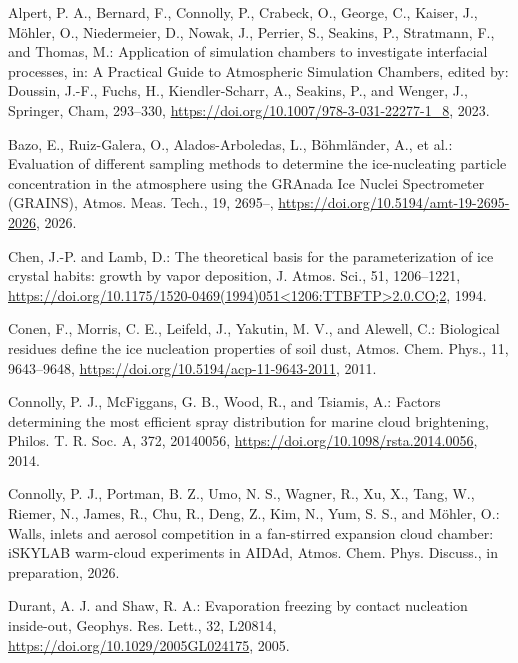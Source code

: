 \begin{thebibliography}{}

Alpert, P. A., Bernard, F., Connolly, P., Crabeck, O., George, C., Kaiser, J., M\"ohler, O., Niedermeier, D., Nowak, J., Perrier, S., Seakins, P., Stratmann, F., and Thomas, M.: Application of simulation chambers to investigate interfacial processes, in: A Practical Guide to Atmospheric Simulation Chambers, edited by: Doussin, J.-F., Fuchs, H., Kiendler-Scharr, A., Seakins, P., and Wenger, J., Springer, Cham, 293--330, \url{https://doi.org/10.1007/978-3-031-22277-1_8}, 2023.

Bazo, E., Ruiz-Galera, O., Alados-Arboledas, L., B\"ohml\"ander, A., et al.: Evaluation of different sampling methods to determine the ice-nucleating particle concentration in the atmosphere using the GRAnada Ice Nuclei Spectrometer (GRAINS), Atmos. Meas. Tech., 19, 2695--, \url{https://doi.org/10.5194/amt-19-2695-2026}, 2026. 

Chen, J.-P. and Lamb, D.: The theoretical basis for the parameterization of ice crystal habits: growth by vapor deposition, J. Atmos. Sci., 51, 1206--1221, \url{https://doi.org/10.1175/1520-0469(1994)051<1206:TTBFTP>2.0.CO;2}, 1994.

Conen, F., Morris, C. E., Leifeld, J., Yakutin, M. V., and Alewell, C.: Biological residues define the ice nucleation properties of soil dust, Atmos. Chem. Phys., 11, 9643--9648, \url{https://doi.org/10.5194/acp-11-9643-2011}, 2011.

Connolly, P. J., McFiggans, G. B., Wood, R., and Tsiamis, A.: Factors determining the most efficient spray distribution for marine cloud brightening, Philos. T. R. Soc. A, 372, 20140056, \url{https://doi.org/10.1098/rsta.2014.0056}, 2014.

Connolly, P. J., Portman, B. Z., Umo, N. S., Wagner, R., Xu, X., Tang, W., Riemer, N., James, R., Chu, R., Deng, Z., Kim, N., Yum, S. S., and M\"ohler, O.: Walls, inlets and aerosol competition in a fan-stirred expansion cloud chamber: iSKYLAB warm-cloud experiments in AIDAd, Atmos. Chem. Phys. Discuss., in preparation, 2026. 

Durant, A. J. and Shaw, R. A.: Evaporation freezing by contact nucleation inside-out, Geophys. Res. Lett., 32, L20814, \url{https://doi.org/10.1029/2005GL024175}, 2005.


\end{thebibliography}
